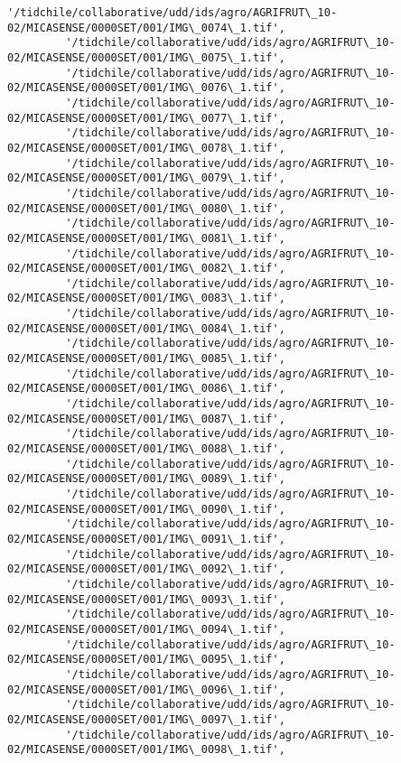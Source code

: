 \documentclass[11pt]{article}
\begin{document}
\begin{Verbatim}[commandchars=\\\{\}]
         '/tidchile/collaborative/udd/ids/agro/AGRIFRUT\_10-02/MICASENSE/0000SET/001/IMG\_0074\_1.tif',
         '/tidchile/collaborative/udd/ids/agro/AGRIFRUT\_10-02/MICASENSE/0000SET/001/IMG\_0075\_1.tif',
         '/tidchile/collaborative/udd/ids/agro/AGRIFRUT\_10-02/MICASENSE/0000SET/001/IMG\_0076\_1.tif',
         '/tidchile/collaborative/udd/ids/agro/AGRIFRUT\_10-02/MICASENSE/0000SET/001/IMG\_0077\_1.tif',
         '/tidchile/collaborative/udd/ids/agro/AGRIFRUT\_10-02/MICASENSE/0000SET/001/IMG\_0078\_1.tif',
         '/tidchile/collaborative/udd/ids/agro/AGRIFRUT\_10-02/MICASENSE/0000SET/001/IMG\_0079\_1.tif',
         '/tidchile/collaborative/udd/ids/agro/AGRIFRUT\_10-02/MICASENSE/0000SET/001/IMG\_0080\_1.tif',
         '/tidchile/collaborative/udd/ids/agro/AGRIFRUT\_10-02/MICASENSE/0000SET/001/IMG\_0081\_1.tif',
         '/tidchile/collaborative/udd/ids/agro/AGRIFRUT\_10-02/MICASENSE/0000SET/001/IMG\_0082\_1.tif',
         '/tidchile/collaborative/udd/ids/agro/AGRIFRUT\_10-02/MICASENSE/0000SET/001/IMG\_0083\_1.tif',
         '/tidchile/collaborative/udd/ids/agro/AGRIFRUT\_10-02/MICASENSE/0000SET/001/IMG\_0084\_1.tif',
         '/tidchile/collaborative/udd/ids/agro/AGRIFRUT\_10-02/MICASENSE/0000SET/001/IMG\_0085\_1.tif',
         '/tidchile/collaborative/udd/ids/agro/AGRIFRUT\_10-02/MICASENSE/0000SET/001/IMG\_0086\_1.tif',
         '/tidchile/collaborative/udd/ids/agro/AGRIFRUT\_10-02/MICASENSE/0000SET/001/IMG\_0087\_1.tif',
         '/tidchile/collaborative/udd/ids/agro/AGRIFRUT\_10-02/MICASENSE/0000SET/001/IMG\_0088\_1.tif',
         '/tidchile/collaborative/udd/ids/agro/AGRIFRUT\_10-02/MICASENSE/0000SET/001/IMG\_0089\_1.tif',
         '/tidchile/collaborative/udd/ids/agro/AGRIFRUT\_10-02/MICASENSE/0000SET/001/IMG\_0090\_1.tif',
         '/tidchile/collaborative/udd/ids/agro/AGRIFRUT\_10-02/MICASENSE/0000SET/001/IMG\_0091\_1.tif',
         '/tidchile/collaborative/udd/ids/agro/AGRIFRUT\_10-02/MICASENSE/0000SET/001/IMG\_0092\_1.tif',
         '/tidchile/collaborative/udd/ids/agro/AGRIFRUT\_10-02/MICASENSE/0000SET/001/IMG\_0093\_1.tif',
         '/tidchile/collaborative/udd/ids/agro/AGRIFRUT\_10-02/MICASENSE/0000SET/001/IMG\_0094\_1.tif',
         '/tidchile/collaborative/udd/ids/agro/AGRIFRUT\_10-02/MICASENSE/0000SET/001/IMG\_0095\_1.tif',
         '/tidchile/collaborative/udd/ids/agro/AGRIFRUT\_10-02/MICASENSE/0000SET/001/IMG\_0096\_1.tif',
         '/tidchile/collaborative/udd/ids/agro/AGRIFRUT\_10-02/MICASENSE/0000SET/001/IMG\_0097\_1.tif',
         '/tidchile/collaborative/udd/ids/agro/AGRIFRUT\_10-02/MICASENSE/0000SET/001/IMG\_0098\_1.tif',

\end{Verbatim}
\end{document}
